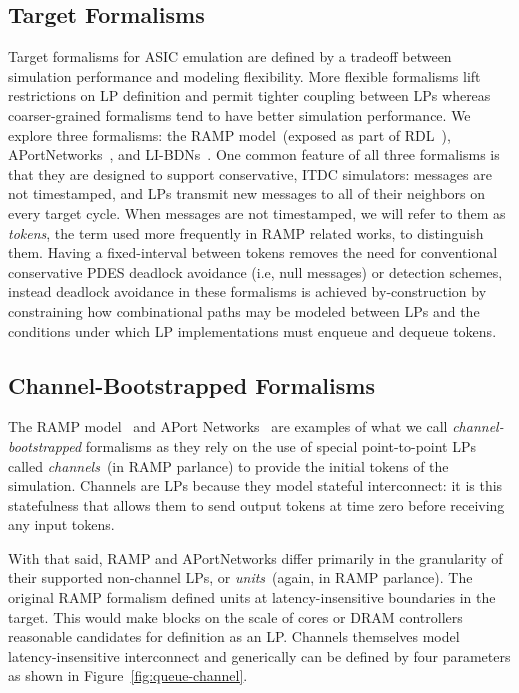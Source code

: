 \subsection{Target Formalisms}

Target formalisms for ASIC emulation are defined by a tradeoff
between simulation performance and modeling flexibility. More flexible
formalisms lift restrictions on LP definition and permit tighter coupling
between LPs whereas coarser-grained formalisms tend
to have better simulation performance. We explore three
formalisms: the RAMP model~(exposed as part of RDL~\cite{RDL}),
APortNetworks~\cite{APortNetworks}, and LI-BDNs~\cite{LIBDN}. One common
feature of all three formalisms is that they are designed to support conservative, ITDC
simulators: messages are not timestamped, and LPs transmit new messages to all
of their neighbors on every target cycle. When messages are not timestamped, we will refer
to them as \emph{tokens}, the term used more frequently in RAMP related works, to distinguish them. 
Having a fixed-interval between tokens removes the need for conventional conservative PDES deadlock avoidance
(i.e, null messages) or detection schemes, instead deadlock avoidance in these
formalisms is achieved by-construction by constraining how combinational paths
may be modeled between LPs and the conditions under which LP implementations
must enqueue and dequeue tokens.

\subsection{Channel-Bootstrapped Formalisms}

The RAMP model~\cite{RDL} and APort Networks~\cite{APortNetworks} are examples of what we call
\emph{channel-bootstrapped} formalisms as they rely on the use of special
point-to-point LPs called \emph{channels}~(in RAMP parlance) to provide the
initial tokens of the simulation. Channels are LPs because they
model stateful interconnect: it is this statefulness that allows them to send output
tokens at time zero before receiving any input tokens.

With that said, RAMP and APortNetworks differ primarily in the granularity of
their supported non-channel LPs, or \emph{units}~(again, in RAMP parlance). The
original RAMP formalism defined units at latency-insensitive boundaries in the
target. This would make blocks on the scale of cores or DRAM controllers
reasonable candidates for definition as an LP. Channels themselves model
latency-insensitive interconnect and generically can be defined by four
parameters as shown in Figure~\ref{fig:queue-channel}.

